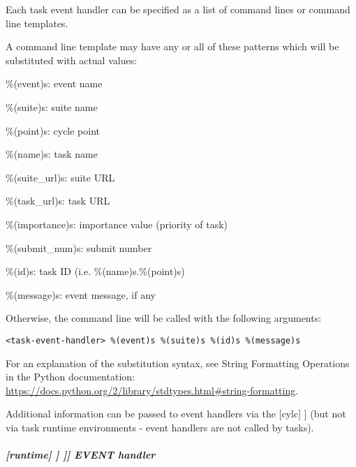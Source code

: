 Each task event handler can be specified as a list of command lines or command
line templates.

A command line template may have any or all of these patterns which will be
substituted with actual values:
\begin{myitemize}
    \item \%(event)s: event name
    \item \%(suite)s: suite name
    \item \%(point)s: cycle point
    \item \%(name)s: task name
    \item \%(suite\_url)s: suite URL
    \item \%(task\_url)s: task URL
    \item \%(importance)s: importance value (priority of task)
    \item \%(submit\_num)s: submit number
    \item \%(id)s: task ID (i.e. \%(name)s.\%(point)s)
    \item \%(message)s: event message, if any
\end{myitemize}

Otherwise, the command line will be called with the following arguments:
\begin{lstlisting}
<task-event-handler> %(event)s %(suite)s %(id)s %(message)s
\end{lstlisting}

For an explanation of the substitution syntax, see String Formatting Operations
in the Python documentation:
\url{https://docs.python.org/2/library/stdtypes.html#string-formatting}.

Additional information can be passed to event handlers via the
[cylc] \textrightarrow [[environment]] (but not via task
runtime environments - event handlers are not called by tasks).

\subparagraph[EVENT handler]{[runtime] \textrightarrow [[\_\_NAME\_\_]] \textrightarrow [[[events]]] \textrightarrow EVENT handler}

